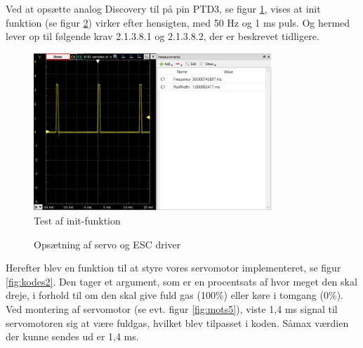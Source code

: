 Ved at opsætte analog Discovery til på pin PTD3, se figur \ref{fig:mots4}, vises at init funktion (se figur \ref{fig:kodes1}) virker efter hensigten, med 50 Hz og 1 ms puls. Og hermed lever op til følgende krav 2.1.3.8.1 og 2.1.3.8.2, der er beskrevet tidligere.

\begin{figure}[h]
  \centering
  \includegraphics[width=0.8\textwidth]{./figurer/mots4.png}
  \caption{Test af init-funktion}
  \label{fig:mots4}
\end{figure}
\clearpage
\begin{figure}[h]
  \centering
    
  \caption{Opsætning af servo og ESC driver}
  \label{fig:kodes1}
\end{figure}
\clearpage

Herefter blev en funktion til at styre vores servomotor implementeret, se figur \ref{fig:kodes2}. Den tager et argument, som er en procentsats af hvor meget den skal dreje, i forhold til om den skal give fuld gas (100\%) eller køre i tomgang (0\%). Ved montering af servomotor (se evt. figur \ref{fig:mots5}), viste 1,4 ms signal til servomotoren sig at være fuldgas, hvilket blev tilpasset i koden. Såmax værdien der kunne sendes ud er 1,4 ms.

%   

